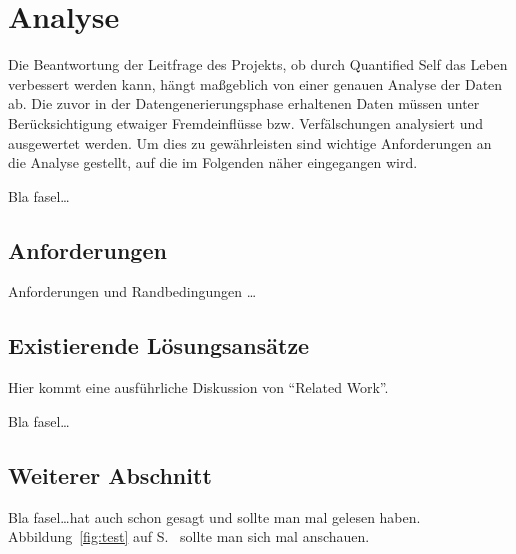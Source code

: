
\chapter{Analyse}
\label{ch:Analyse}

Die Beantwortung der Leitfrage des Projekts, ob durch Quantified Self das Leben verbessert werden kann, hängt maßgeblich von einer genauen Analyse der Daten ab. 
Die zuvor in der Datengenerierungsphase erhaltenen Daten müssen unter Berücksichtigung etwaiger Fremdeinflüsse bzw. Verfälschungen analysiert und ausgewertet werden.
Um dies zu gewährleisten sind wichtige Anforderungen an die Analyse gestellt, auf die im Folgenden näher eingegangen wird.


Bla fasel\ldots

\section{Anforderungen}
\label{ch:Analyse:sec:Anforderungen}
Anforderungen und Randbedingungen \ldots

\section{Existierende Lösungsansätze}
\label{ch:Analyse:sec:RelatedWork}

Hier kommt eine ausführliche Diskussion
von "`Related Work"'.

Bla fasel\ldots

\section{Weiterer Abschnitt}
\label{ch:Analyse:sec:Abschnitt}

Bla fasel\ldots hat auch schon \cite{TB2000} gesagt und
\cite{TB98,JSAC96,qosr} sollte man mal gelesen haben.
Abbildung~\ref{fig:test} auf S.~\pageref{fig:test} sollte man
sich mal anschauen.

